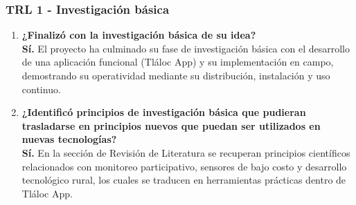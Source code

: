 \subsubsection*{TRL 1 - Investigación básica}
\begin{enumerate}
    \item \textbf{¿Finalizó con la investigación básica de su idea?} \\ \textbf{Sí.} El proyecto ha culminado su fase de investigación básica con el desarrollo de una aplicación funcional (Tláloc App) y su implementación en campo, demostrando su operatividad mediante su distribución, instalación y uso continuo.
    
    \item \textbf{¿Identificó principios de investigación básica que pudieran trasladarse en principios nuevos que puedan ser utilizados en nuevas tecnologías?} \\ \textbf{Sí.} En la sección de Revisión de Literatura se recuperan principios científicos relacionados con monitoreo participativo, sensores de bajo costo y desarrollo tecnológico rural, los cuales se traducen en herramientas prácticas dentro de Tláloc App.
\end{enumerate}

